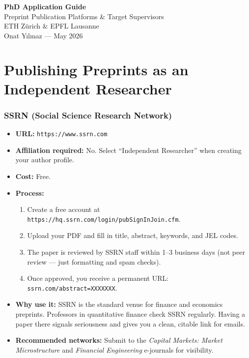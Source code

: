 \documentclass[11pt,a4paper]{article}
\newcommand{\url}[1]{\texttt{#1}}
\begin{document}
\begin{center}
{\LARGE\bfseries PhD Application Guide}\\[0.3cm]
{\Large Preprint Publication Platforms \& Target Supervisors}\\[0.3cm]
{\large ETH Z\"urich \& EPFL Lausanne}\\[0.5cm]
{\large Onat Y{\i}lmaz --- May 2026}
\end{center}

\bigskip
\tableofcontents
\newpage

\part{Publishing Preprints as an Independent Researcher}

\section{SSRN (Social Science Research Network)}

\begin{itemize}
  \item \textbf{URL:} \url{https://www.ssrn.com}
  \item \textbf{Affiliation required:} No. Select ``Independent Researcher'' when creating your author profile.
  \item \textbf{Cost:} Free.
  \item \textbf{Process:}
    \begin{enumerate}
      \item Create a free account at \url{https://hq.ssrn.com/login/pubSignInJoin.cfm}.
      \item Upload your PDF and fill in title, abstract, keywords, and JEL codes.
      \item The paper is reviewed by SSRN staff within 1--3 business days (not peer review --- just formatting and spam checks).
      \item Once approved, you receive a permanent URL: \texttt{ssrn.com/abstract=XXXXXXX}.
    \end{enumerate}
  \item \textbf{Why use it:} SSRN is the standard venue for finance and economics preprints. Professors in quantitative finance check SSRN regularly. Having a paper there signals seriousness and gives you a clean, citable link for emails.
  \item \textbf{Recommended networks:} Submit to the \textit{Capital Markets: Market Microstructure} and \textit{Financial Engineering} e-journals for visibility.
\end{itemize}
\end{document}

